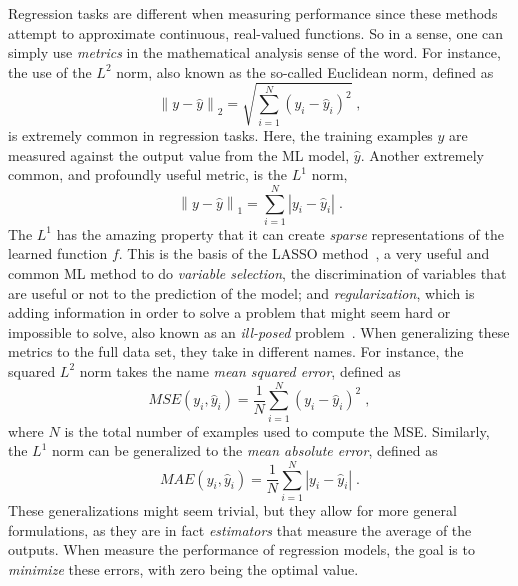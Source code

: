 Regression tasks are different when measuring performance since these methods attempt to 
approximate continuous, real-valued functions. So in a sense, one can simply use \emph
{metrics} in the mathematical analysis sense of the word. For instance, the use of the 
$L^2$ norm, also known as the so-called Euclidean norm, defined as
\begin{equation}
    { \left\lVert y - \hat{y} \right\rVert }_{2} = \sqrt{ \sum_{i=1}^{N} { \left(y_i - \hat{y}_i \right) }^2 }
    \; ,
    \label{eq:l2norm}
\end{equation}
is extremely common in regression tasks. Here, the training examples $y$ are measured 
against the output value from the ML model, $\hat{y}$. Another extremely common, and 
profoundly useful metric, is the $L^1$ norm,
\begin{equation}
    { \left\lVert y - \hat{y} \right\rVert }_{1} = \sum_{i=1}^{N} \left\lvert y_i - \hat{y}_i \right\rvert
    \; .
    \label{eq:l1norm}
\end{equation}
The $L^1$ has the amazing property that it can create \emph{sparse} representations of the 
learned function $f$. This is the basis of the LASSO method~\cite{hastieElementsStatisticalLearning2009}, a very useful and common ML method to do 
\emph{variable selection}, the discrimination of variables that are useful or not to the 
prediction of the model; and \emph{regularization}, which is adding information in order to 
solve a problem that might seem hard or impossible to solve, also known as an
\emph{ill-posed} problem~\cite{goodfellowDeepLearning2016}.
When generalizing these metrics to the full data set, they take in different names. For 
instance, the squared $L^2$ norm takes the name \emph{mean squared error}, defined as
\begin{equation}
    MSE \left( y_i, \hat{y}_i \right) = \frac{1}{N} \sum_{i=1}^{N} { \left(y_i - \hat{y}_i \right) }^2
    \; ,
    \label{eq:mse} 
\end{equation}
where $N$ is the total number of examples used to compute the MSE. Similarly, the $L^1$ 
norm can be generalized to the \emph{mean absolute error}, defined as
\begin{equation}
    MAE \left( y_i, \hat{y}_i \right) = \frac{1}{N} \sum_{i=1}^{N} \left\lvert y_i - \hat{y}_i \right\rvert
    \; .
    \label{eq:mae}
\end{equation}
These generalizations might seem trivial, but they allow for more general formulations, as 
they are in fact \emph{estimators} that measure the average of the outputs. When measure 
the performance of regression models, the goal is to \emph{minimize} these errors, with 
zero being the optimal value.

